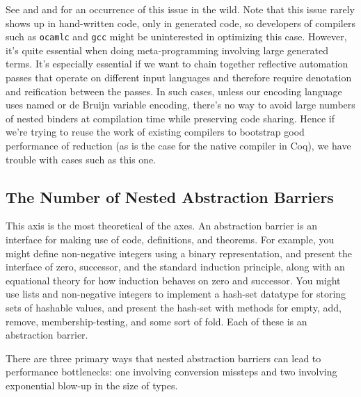 See  and  and  for an occurrence of this issue in the wild.
Note that this issue rarely shows up in hand-written code, only in generated code, so developers of compilers such as \texttt{ocamlc} and \texttt{gcc} might be uninterested in optimizing this case.
However, it's quite essential when doing meta-programming involving large generated terms.
It's especially essential if we want to chain together reflective automation passes that operate on different input languages and therefore require denotation and reification between the passes.
In such cases, unless our encoding language uses named or de Bruijn variable encoding, there's no way to avoid large numbers of nested binders at compilation time while preserving code sharing.
Hence if we're trying to reuse the work of existing compilers to bootstrap good performance of reduction (as is the case for the native compiler in Coq), we have trouble with cases such as this one.



\subsection{The Number of Nested Abstraction Barriers}


This axis is the most theoretical of the axes.
An abstraction barrier is an interface for making use of code, definitions, and theorems.
For example, you might define non-negative integers using a binary representation, and present the interface of zero, successor, and the standard induction principle, along with an equational theory for how induction behaves on zero and successor.
You might use lists and non-negative integers to implement a hash-set datatype for storing sets of hashable values, and present the hash-set with methods for empty, add, remove, membership-testing, and some sort of fold.
Each of these is an abstraction barrier.

There are three primary ways that nested abstraction barriers can lead to performance bottlenecks: one involving conversion missteps and two involving exponential blow-up in the size of types.

